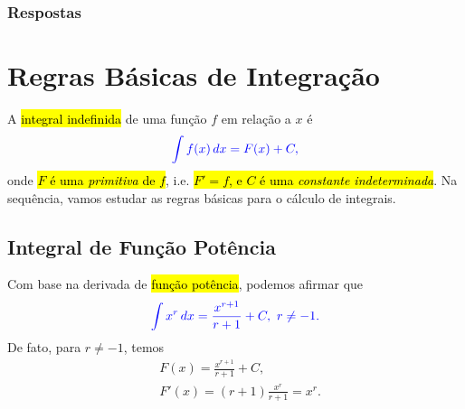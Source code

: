 \ifisbook
\subsubsection{Respostas}
\shipoutAnswer
\fi


\section{Regras Básicas de Integração}\label{cap_int_sec_regrasbasic}

A \hl{integral indefinida} de uma função $f$ em relação a $x$ é
\begin{equation}\color{blue}\int f(x)\,dx = F(x) + C,
\end{equation}
onde \hl{$F$ é uma \emph{primitiva} de $f$}, i.e. \hl{$F' = f$, e $C$ é uma \emph{constante indeterminada}}. Na sequência, vamos estudar as regras básicas para o cálculo de integrais.

\subsection{Integral de Função Potência}

Com base na derivada de \hl{função potência}, podemos afirmar que
\begin{equation}\label{eq:int_fpot}\color{blue}\int x^r\,dx = \frac{x^{r+1}}{r+1} + C, ~r\neq -1.
\end{equation}
De fato, para $r\neq -1$, temos
\begin{align}
  & F(x) = \frac{x^{r+1}}{r+1} + C, \\
  & F'(x) = (r+1) \frac{x^r}{r+1} = x^r.
\end{align}

